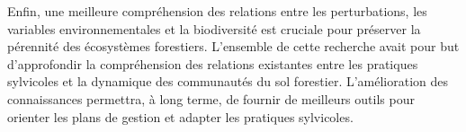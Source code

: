 Enfin, une meilleure compréhension des relations entre les perturbations, les variables environnementales et la biodiversité est cruciale pour préserver la pérennité des écosystèmes forestiers. 
L’ensemble de cette recherche avait pour but d'approfondir la compréhension des relations existantes entre les pratiques sylvicoles et la dynamique des communautés du sol forestier. 
L'amélioration des connaissances permettra, à long terme, de fournir de meilleurs outils pour orienter les plans de gestion et adapter les pratiques sylvicoles.


\cleardoublepage


